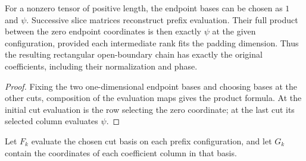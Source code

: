 \begin{lemma}
    \label{thm:mpu_minimal_cut_coordinate_reconstruction}
    \leanok
    For a nonzero tensor of positive length, the endpoint bases can
    be chosen as $1$ and $\psi$. Successive slice matrices reconstruct
    prefix evaluation. Their full product between the zero endpoint
    coordinates is then exactly $\psi$ at the given configuration,
    provided each intermediate rank fits the padding dimension.
    Thus the resulting rectangular open-boundary chain has exactly
    the original coefficients, including their normalization and phase.
\end{lemma}
\begin{proof}\leanok
    Fixing the two one-dimensional endpoint bases and choosing bases
    at the other cuts, composition of the evaluation maps gives
    the product formula. At the initial cut evaluation is the row
    selecting the zero coordinate; at the last cut its selected
    column evaluates $\psi$.
\end{proof}

\begin{definition}
    \label{def:mpu_minimal_cut_factors}
    \leanok
    Let $F_k$ evaluate the chosen cut basis on each prefix configuration,
    and let $G_k$ contain the coordinates of each coefficient column
    in that basis.
\end{definition}

